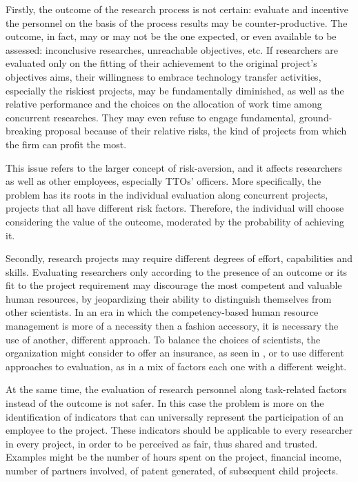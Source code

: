 Firstly, the outcome of the research process is not certain: evaluate and incentive the personnel on the basis of the process results may be counter-productive. The outcome, in fact, may or may not be the one expected, or even available to be assessed: inconclusive researches, unreachable objectives, etc. If researchers are evaluated only on the fitting of their achievement to the original project's objectives aims, their willingness to embrace technology transfer activities, especially the riskiest projects, may be fundamentally diminished, as well as the relative performance and the choices on the allocation of work time among concurrent researches. They may even refuse to engage fundamental, ground-breaking proposal because of their relative risks, the kind of projects from which the firm can profit the most. 

This issue refers to the larger concept of risk-aversion, and it affects researchers as well as other employees, especially TTOs' officers. More specifically, the problem has its roots in the individual evaluation along concurrent projects, projects that all have different risk factors. Therefore, the individual will choose considering the value of the outcome, moderated by the probability of achieving it. 

Secondly, research projects may require different degrees of effort, capabilities and skills. Evaluating researchers only according to the presence of an outcome or its fit to the project requirement may discourage the most competent and valuable human resources, by jeopardizing their ability to distinguish themselves from other scientists. In an era in which the competency-based human resource management is more of a necessity then a fashion accessory, it is necessary the use of another, different approach. To balance the choices of scientists, the organization might consider to offer an insurance, as seen in \citet{Panagopoulos2013}, or to use different approaches to evaluation, as in a mix of factors each one with a different weight.

At the same time, the evaluation of research personnel along task-related factors instead of the outcome is not safer. In this case the problem is more on the identification of indicators that can universally represent the participation of an employee to the project. These indicators should be applicable to every researcher in every project, in order to be perceived as fair, thus shared and trusted. Examples might be the number of hours spent on the project, financial income, number of partners involved, of patent generated, of subsequent child projects. 


